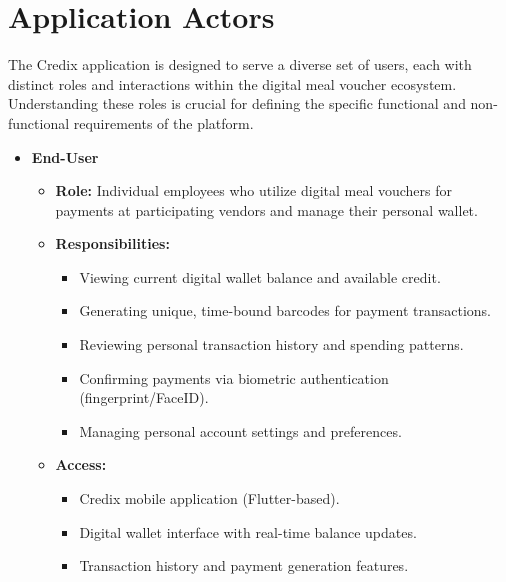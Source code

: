 \section{Application Actors}

The Credix application is designed to serve a diverse set of users, each with distinct roles and interactions within the digital meal voucher ecosystem. Understanding these roles is crucial for defining the specific functional and non-functional requirements of the platform.

\begin{itemize}
    \item \textbf{End-User}
    \begin{itemize}
        \item \textbf{Role:} Individual employees who utilize digital meal vouchers for payments at participating vendors and manage their personal wallet.
        \item \textbf{Responsibilities:}
        \begin{itemize}
            \item Viewing current digital wallet balance and available credit.
            \item Generating unique, time-bound barcodes for payment transactions.
            \item Reviewing personal transaction history and spending patterns.
            \item Confirming payments via biometric authentication (fingerprint/FaceID).
            \item Managing personal account settings and preferences.
        \end{itemize}
        \item \textbf{Access:}
        \begin{itemize}
            \item Credix mobile application (Flutter-based).
            \item Digital wallet interface with real-time balance updates.
            \item Transaction history and payment generation features.
        \end{itemize}
    \end{itemize}


\end{itemize}

